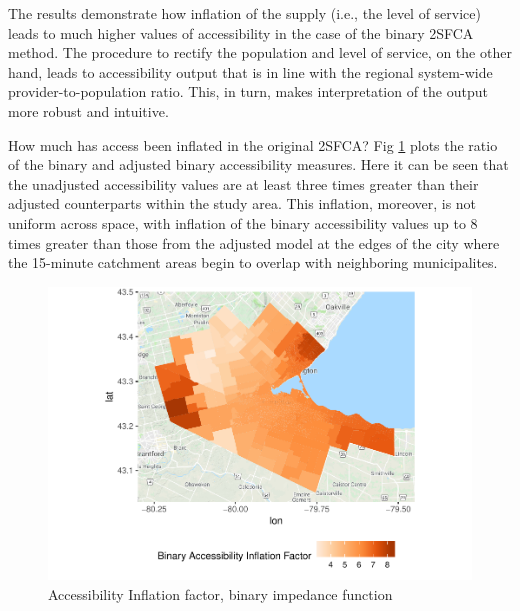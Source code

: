 \documentclass[10pt,letterpaper]{article}
\begin{document}
The results demonstrate how inflation of the supply (i.e., the level of
service) leads to much higher values of accessibility in the case of the
binary 2SFCA method. The procedure to rectify the population and level
of service, on the other hand, leads to accessibility output that is in
line with the regional system-wide provider-to-population ratio. This,
in turn, makes interpretation of the output more robust and intuitive.

How much has access been inflated in the original 2SFCA? Fig
\ref{fig:fig9-map-accessibility-binary-comparison} plots the ratio of
the binary and adjusted binary accessibility measures. Here it can be
seen that the unadjusted accessibility values are at least three times
greater than their adjusted counterparts within the study area. This
inflation, moreover, is not uniform across space, with inflation of the
binary accessibility values up to 8 times greater than those from the
adjusted model at the edges of the city where the 15-minute catchment
areas begin to overlap with neighboring municipalites.

\begin{figure}
\centering
\includegraphics{Supply_and_Demand_Inflation_in_FCA_Methods_v2.0_files/figure-latex/fig9-map-accessibility-binary-comparison-1.pdf}
\caption{\label{fig:fig9-map-accessibility-binary-comparison}Accessibility
Inflation factor, binary impedance function}
\end{figure}
\end{document}
